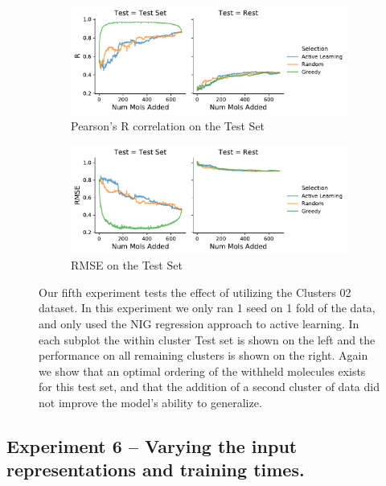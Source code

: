 \documentclass[journal=jmcmar,manuscript=article]{achemso}
\begin{document}
\begin{figure}[tbph]
    \centering
    \begin{subfigure}[b]{0.48\textwidth}
        \includegraphics[width=1\linewidth]{figures/fig5_lc02_R.pdf}
        \caption{Pearson's R correlation on the Test Set}
    \end{subfigure}%
    \hfill
    \begin{subfigure}[b]{0.48\textwidth}
        \includegraphics[width=1\linewidth]{figures/fig5_lc02_RMSE.pdf}
        \caption{RMSE on the Test Set}
    \end{subfigure}
    \caption{Our fifth experiment tests the effect of utilizing the Clusters 02 dataset. In this experiment we only ran 1 seed on 1 fold of the data, and only used the NIG regression approach to active learning. In each subplot the within cluster Test set is shown on the left and the performance on all remaining clusters is shown on the right. Again we show that an optimal ordering of the withheld molecules exists for this test set, and that the addition of a second cluster of data did not improve the model's ability to generalize.}
    \label{fig:lc02greed}
\end{figure}

\subsection{Experiment 6 -- Varying the input representations and training times.}
\end{document}
